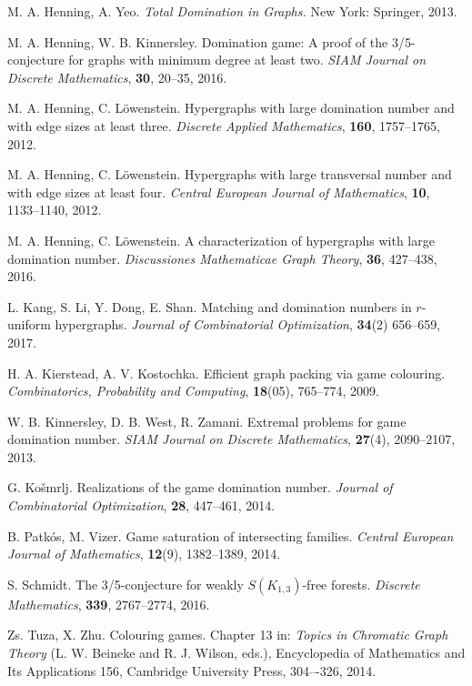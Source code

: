 \documentclass[12pt]{article}
\begin{document}
\begin{thebibliography}{99}
 M. A. Henning, A. Yeo. \textit{Total Domination in Graphs.} New York: Springer, 2013.

M. A. Henning, W. B. Kinnersley.
Domination game: A proof of the 3/5-conjecture for graphs with minimum degree at least two. {\it SIAM Journal on Discrete Mathematics}, {\bfseries 30}, 20--35, 2016.

M. A. Henning, C. L\" owenstein. Hypergraphs with large domination number and with edge sizes at least three. {\it Discrete Applied Mathematics}, {\bfseries 160}, 1757--1765, 2012.

M. A. Henning, C. L\"owenstein. Hypergraphs with large transversal number and with edge
sizes at least four. {\it Central European Journal of Mathematics}, {\bfseries 10}, 1133--1140, 2012.

M. A. Henning, C. L\"owenstein. A characterization of hypergraphs with large domination number. {\it Discussiones Mathematicae Graph Theory}, {\bfseries 36}, 427--438, 2016.

L. Kang, S. Li, Y. Dong, E. Shan. Matching and domination numbers in $r$-uniform hypergraphs. {\it Journal of Combinatorial Optimization}, {\bfseries 34}(2) 656--659, 2017.

 H. A. Kierstead, A. V. Kostochka. Efficient graph packing via game colouring. \textit{Combinatorics, Probability and Computing}, \textbf{18}(05), 765--774, 2009.


 W. B. Kinnersley, D. B. West, R. Zamani.
Extremal problems for game domination number.
{\it  SIAM Journal on Discrete Mathematics},
{\bfseries 27}(4),  2090--2107, 2013.

  G. Ko\v smrlj.
Realizations of the game domination number.
\textit{Journal of Combinatorial Optimization}, 
{\bfseries 28}, 447--461, 2014.

 B. Patk\'os, M. Vizer. Game saturation of intersecting families. \textit{Central European Journal of Mathematics}, \textbf{12}(9), 1382--1389, 2014.

S. Schmidt. The 3/5-conjecture for weakly $S(K_{1,3})$-free
 forests. {\it Discrete Mathematics}, {\bfseries 339}, 2767--2774, 2016.

 Zs. Tuza, X. Zhu. Colouring games. Chapter 13 in: \textit{Topics in Chromatic Graph Theory} (L. W. Beineke and R. J. Wilson, eds.), Encyclopedia of Mathematics and Its
Applications 156, Cambridge University Press, 304–-326, 2014.

\end{thebibliography}
\end{document}
